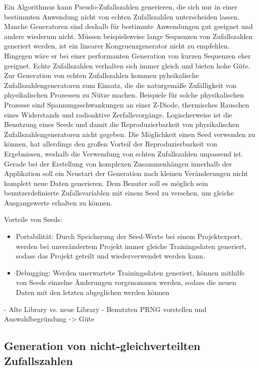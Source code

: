 Ein Algorithmus kann Pseudo-Zufallszahlen generieren, die sich nur in einer bestimmten Anwendung nicht von echten Zufallszahlen unterscheiden lassen. Manche Generatoren sind deshalb für bestimmte Anwendungen gut geeignet und andere wiederum nicht. Müssen beispielsweise lange Sequenzen von Zufallszahlen generiert werden, ist ein linearer Kongruenzgenerator nicht zu empfehlen. Hingegen wäre er bei einer performanten Generation von kurzen Sequenzen eher geeignet. Echte Zufallszahlen verhalten sich immer gleich und bieten hohe Güte. Zur Generation von echten Zufallszahlen kommen pyhsikalische Zufallszahlengeneratoren zum Einsatz, die die naturgemäße Zufälligkeit von physikalischen Prozessen zu Nütze machen.
Beispiele für solche physikalischen Prozesse sind Spannungsschwankungen an einer Z-Diode, thermisches Rauschen eines Widerstands und radioaktive Zerfallsvorgänge. Logischerweise ist die Benutzung eines Seeds und damit die Reproduzierbarkeit von physikalischen Zufallszahlengeneratoren nicht gegeben.
Die Möglichkeit einen Seed verwenden zu können, hat allerdings den großen Vorteil der Reproduzierbarkeit von Ergebnissen, weshalb die Verwendung von echten Zufallszahlen unpassend ist. Gerade bei der Erstellung von komplexen Zusammenhängen innerhalb der Applikation soll ein Neustart der Generation nach kleinen Veränderungen nicht komplett neue Daten generieren. Dem Benuter soll es möglich sein benutzerdefinierte Zufallsvariablen mit einem Seed zu versehen, um gleiche Ausgangswerte erhalten zu können.

Vorteile von Seeds:
\begin{itemize}
    \item Portabilität: Durch Speicherung der Seed-Werte bei einem Projektexport, werden bei unverändertem Projekt immer gleiche Trainingsdaten generiert, sodass das Projekt geteilt und wiederverwendet werden kann. 
    \item Debugging: Werden unerwartete Trainingsdaten generiert, können mithilfe von Seeds einzelne Änderungen vorgenommen werden, sodass die neuen Daten mit den letzten abgeglichen werden können
\end{itemize}

- Alte Library vs. neue Library
- Benutzten PRNG vorstellen und Auswahlbegründung -> Güte

\subsection{Generation von nicht-gleichverteilten Zufallszahlen}

